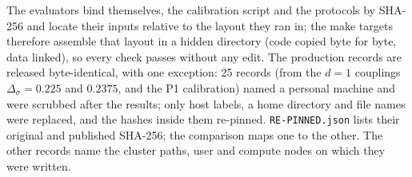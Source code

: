 \documentclass[10pt,a4paper]{article}
\newcommand{\Ds}{\Delta_\sigma}
\newcommand{\code}[1]{\texttt{#1}}
\begin{document}
The evaluators bind themselves, the calibration script and the protocols by SHA-256 and locate their inputs relative to the layout they ran in;
the make targets therefore assemble that layout in a hidden  directory (code copied byte for byte, data linked), so every check
passes without any edit. The production records are released byte-identical, with one exception: 25 records (from the $d=1$ couplings
$\Ds=0.225$ and $0.2375$, and the P1 calibration) named a personal machine and were scrubbed after the results; only host labels, a home
directory and file names were replaced, and the hashes inside them re-pinned. \code{RE-PINNED.json} lists their original and published
SHA-256; the comparison maps one to the other. The other records name the cluster paths, user and compute nodes on which they were written.
\end{document}

